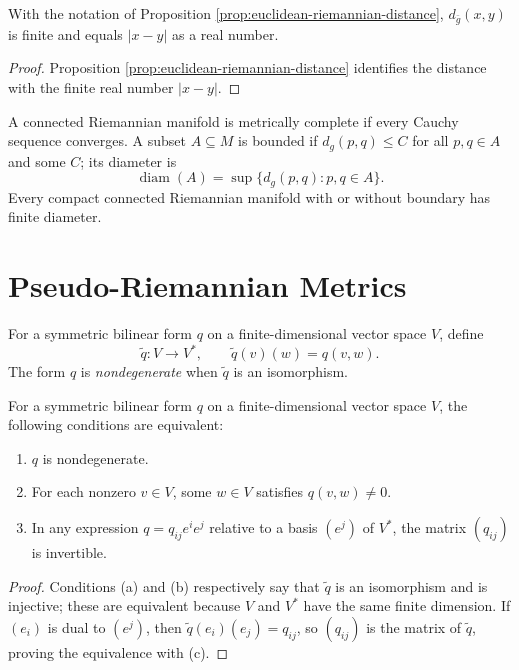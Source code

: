 \begin{lemma}
\label{lem:euclidean-riemannian-distance-real}
\leanok
{}
With the notation of Proposition \ref{prop:euclidean-riemannian-distance}, $d_{\bar g}(x,y)$ is finite and equals $|x-y|$ as a real number.
\end{lemma}
\begin{proof}
\leanok
{}
\sketch Proposition \ref{prop:euclidean-riemannian-distance} identifies the distance with the finite real number $|x-y|$.
\end{proof}

A connected Riemannian manifold is metrically complete if every Cauchy sequence converges. A subset $A\subseteq M$ is bounded if $d_g(p,q)\le C$ for all $p,q\in A$ and some $C$; its diameter is
\[
\operatorname{diam}(A)=\sup\{d_g(p,q):p,q\in A\}.
\]
Every compact connected Riemannian manifold with or without boundary has finite diameter.
\section{Pseudo-Riemannian Metrics}

For a symmetric bilinear form $q$ on a finite-dimensional vector space $V$, define
\[
\widetilde q\colon V\longrightarrow V^*,
\qquad \widetilde q(v)(w)=q(v,w).
\]
The form $q$ is \emph{nondegenerate} when $\widetilde q$ is an isomorphism.

\begin{lemma}
\label{lem:nondegenerate-symmetric-bilinear}
\leanok
{}
For a symmetric bilinear form $q$ on a finite-dimensional vector space $V$, the
following conditions are equivalent:
\begin{enumerate}
\item[(a)] $q$ is nondegenerate.
\item[(b)] For each nonzero $v\in V$, some $w\in V$ satisfies $q(v,w)\ne0$.
\item[(c)] In any expression $q=q_{ij}e^ie^j$ relative to a basis $(e^j)$ of
$V^*$, the matrix $(q_{ij})$ is invertible.
\end{enumerate}
\end{lemma}

\begin{proof}
\leanok
\sketch Conditions (a) and (b) respectively say that $\widetilde q$ is an
isomorphism and is injective; these are equivalent because $V$ and $V^*$ have the
same finite dimension. If $(e_i)$ is dual to $(e^j)$, then
$\widetilde q(e_i)(e_j)=q_{ij}$, so $(q_{ij})$ is the matrix of $\widetilde q$,
proving the equivalence with (c).
\end{proof}

